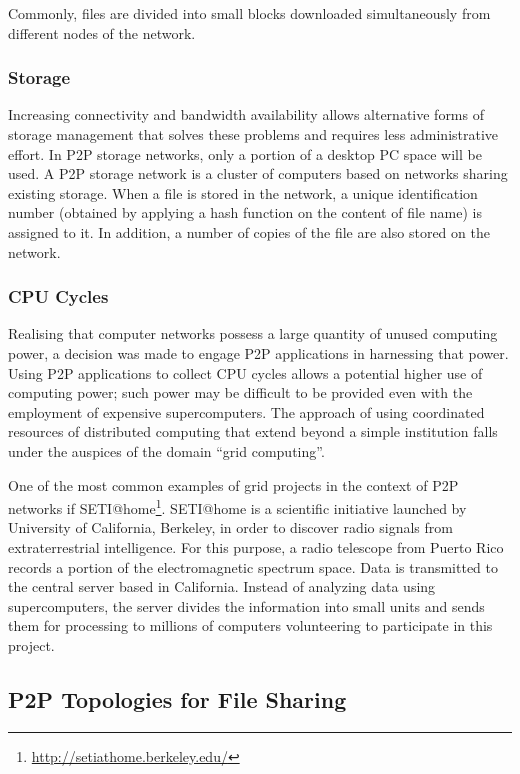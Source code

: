Commonly, files are divided into small blocks downloaded simultaneously from
different nodes of the network.

\subsubsection{Storage}

Increasing connectivity and bandwidth availability allows alternative forms of
storage management that solves these problems and requires less administrative
effort. In P2P storage networks, only a portion of a desktop PC space will be
used. A P2P storage network is a cluster of computers based on networks sharing
existing storage. When a file is stored in the network, a unique identification
number (obtained by applying a hash function on the content of file name) is
assigned to it. In addition, a number of copies of the file are also stored on
the network.

\subsubsection{CPU Cycles}

Realising that computer networks possess a large quantity of unused computing
power, a decision was made to engage P2P applications in harnessing that power.
Using P2P applications to collect CPU cycles allows a potential higher use
of computing power; such power may be difficult to be provided even with the
employment of expensive supercomputers. The approach of using coordinated
resources of distributed computing that extend beyond a simple institution
falls under the auspices of the domain ``grid computing''.

One of the most common examples of grid projects in the context of P2P networks
if SETI@home\footnote{\url{http://setiathome.berkeley.edu/}}. SETI@home is a scientific initiative launched by
University of California, Berkeley, in order to discover radio signals from
extraterrestrial intelligence. For this purpose, a radio telescope from Puerto
Rico records a portion of the electromagnetic spectrum space. Data is
transmitted to the central server based in California. Instead of analyzing
data using supercomputers, the server divides the information into small units
and sends them for processing to millions of computers volunteering to
participate in this project.

\subsection{P2P Topologies for File Sharing}

